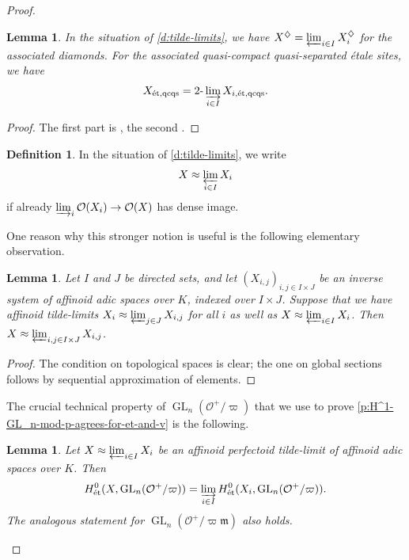 \documentclass[10pt,a4paper]{article}
\newtheorem{Lemma}[thm]{Lemma}
\theoremstyle{definition}
\newtheorem{Definition}[thm]{Definition}
\theoremstyle{remark}
\renewcommand{\O}{\mathcal{O}}
\newcommand{\m}{\mathfrak{m}}
\newcommand{\GL}{\operatorname{GL}}
\newcommand{\et}{{\operatorname{\acute{e}t}}}
\newcommand{\etqcqs}{{\operatorname{\acute{e}t,qcqs}}}
\numberwithin{equation}{section}
\begin{document}
\begin{proof}
        \begin{Lemma}\label{l:tilde-lim-2-lim-on-etqcqs}
		In the situation of \cref{d:tilde-limits}, we have $X^\diamondsuit=\varprojlim_{i\in I} X_i^\diamondsuit$ for the associated diamonds. For the associated quasi-compact quasi-separated \'etale sites, we have 
		\[ X_{\etqcqs}=2\text{-}\varinjlim_{i\in I}X_{i,\etqcqs}.\]
	\end{Lemma}
        
	\begin{proof}
		The first part is \cite[Proposition~2.4.5]{ScholzeWeinstein}, the second  \cite[Proposition~11.23]{etale-cohomology-of-diamonds}.
	\end{proof}

	\begin{Definition}\label{d:tilde-limit-approx-version}
		In the situation of \cref{d:tilde-limits}, we write 
		\[ X\approx \varprojlim_{i\in I} X_i\]
		if already $\varinjlim_{i}\O(X_i)\to \O(X)$ has dense image.
	\end{Definition}

        One reason why this stronger notion is useful is the following elementary observation. 

        \begin{Lemma}\label{l:pointwise-approximation}
		Let $I$ and $J$ be directed sets, and let $(X_{i,j})_{i,j\in I\times J}$ be an inverse system of affinoid adic spaces over $K$, indexed over $I\times J$. Suppose that we have affinoid tilde-limits $X_i\approx \varprojlim_{j\in J} X_{i,j}$ for all $i$ as well as $X\approx \varprojlim_{i\in I}X_i$. Then $X\approx\varprojlim_{i,j\in I\times J} X_{i,j}$.
	\end{Lemma}
        
	\begin{proof}
		The condition on topological spaces is clear; the one on global sections follows by sequential approximation of elements.
	\end{proof}

	The crucial technical property of $\GL_n(\O^+/\varpi)$ that we use to prove \cref{p:H^1-GL_n-mod-p-agrees-for-et-and-v} is the following. 

	\begin{Lemma}\label{p:GL_n(O^+/p^n)-in-proet-site}
		Let $X\approx \varprojlim_{i\in I} X_i$ be an affinoid perfectoid tilde-limit of affinoid adic spaces over $K$. Then
		\[ H^0_{\et}(X,\GL_n(\O^+/\varpi))=\varinjlim_{i\in I} H^0_{\et}(X_i,\GL_n(\O^+/\varpi)).\]
		The analogous statement for $\GL_n(\O^+/\varpi\m)$ also holds.
	\end{Lemma}


\end{proof}
\end{document}
